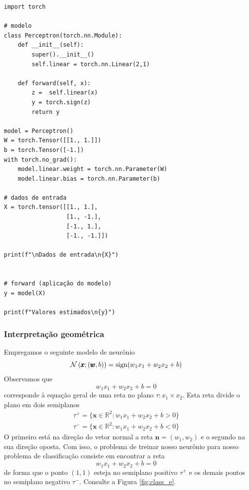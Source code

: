 \begin{lstlisting}[caption=perceptron.py, label=cap_perceptron_sec_unit:cod:perceptron]
import torch

# modelo
class Perceptron(torch.nn.Module):
    def __init__(self):
        super().__init__()
        self.linear = torch.nn.Linear(2,1)

    def forward(self, x):
        z =  self.linear(x)
        y = torch.sign(z)
        return y

model = Perceptron()
W = torch.Tensor([[1., 1.]])
b = torch.Tensor([-1.])
with torch.no_grad():
    model.linear.weight = torch.nn.Parameter(W)
    model.linear.bias = torch.nn.Parameter(b)

# dados de entrada
X = torch.tensor([[1., 1.],
                  [1., -1.],
                  [-1., 1.],
                  [-1., -1.]])

print(f"\nDados de entrada\n{X}")


# forward (aplicação do modelo)
y = model(X)

print(f"Valores estimados\n{y}")
\end{lstlisting}

\subsubsection{Interpretação geométrica}

Empregamos o seguinte modelo de neurônio
\begin{equation}
  \mathcal{N}\left(\pmb{x};(\pmb{w},b)\right) = \operatorname{sign}(w_1x_1 + w_2x_2 + b)
\end{equation}
Observamos que
\begin{equation}
  w_1x_1 + w_2x_2 + b = 0
\end{equation}
corresponde à equação geral de uma reta no plano $\tau: x_1\times x_2$. Esta reta divide o plano em dois semiplanos
\begin{align}
  \tau^+ = \{\pmb{x}\in\mathbb{R}^2: w_1x_1 + w_2x_2 + b > 0\}\\
  \tau^- = \{\pmb{x}\in\mathbb{R}^2: w_1x_1 + w_2x_2 + b < 0\}
\end{align}
O primeiro está na direção do vetor normal a reta $\pmb{n} = (w_1, w_2)$ e o segundo na sua direção oposta. Com isso, o problema de treinar nosso neurônio para nosso problema de classificação consiste em encontrar a reta
\begin{equation}
  w_1x_1 + w_2x_2 + b = 0
\end{equation}
de forma que o ponto $(1,1)$ esteja no semiplano positivo $\tau^+$ e os demais pontos no semiplano negativo $\tau^-$. Consulte a Figura \ref{fig:class_e}.

